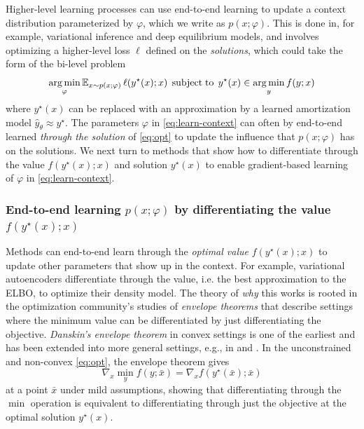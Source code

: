 \documentclass[twoside,11pt]{article}
\newcommand{\eg}{e.g.\xspace}
\newcommand{\ie}{i.e.\xspace}
\begin{document}
Higher-level learning processes can use end-to-end learning
to update a context distribution parameterized by
$\varphi$, which we write as $p(x; \varphi)$.
This is done in, for example, variational inference
and deep equilibrium models, and involves optimizing
a higher-level loss $\ell$ defined on the \emph{solutions},
which could take the form of the bi-level problem
\begin{equation}
  \operatorname*{arg\,min}_{\varphi} \operatorname{\mathbb{E}}_{x\sim p(x; \varphi)} \ell(y^\star(x); x)\;
  \operatorname*{subject\;to}\; y^\star(x)\in\operatorname*{arg\,min}_y f(y; x)
\label{eq:learn-context}
\end{equation}
where $y^\star(x)$ can be replaced with an approximation
by a learned amortization model $\hat y_\theta \approx y^\star$.
The parameters $\varphi$ in \cref{eq:learn-context} can
often by end-to-end learned \emph{through the solution} of
\cref{eq:opt} to update the influence that $p(x; \varphi)$
has on the solutions.
We next turn to methods that show how to differentiate
through the value $f(y^\star(x); x)$ and solution
$y^\star(x)$ to enable gradient-based learning of
$\varphi$ in \cref{eq:learn-context}.

\subsubsection{End-to-end learning $p(x; \varphi)$ by differentiating
  the value $f(y^\star(x); x)$}
Methods can end-to-end learn through the \emph{optimal value}
$f(y^\star(x); x)$ to update other parameters that show up
in the context.
For example, variational autoencoders differentiate through
the value, \ie the best approximation to the ELBO,
to optimize their density model.
The theory of \emph{why} this works is rooted in the
optimization community's studies of
\emph{envelope theorems}
that describe settings where the minimum value
can be differentiated by just differentiating
the objective.
\emph{Danskin's envelope theorem} \citep{danskin1966theory}
in convex settings is one of the earliest and has been
extended into more general settings, \eg, in
\citep[Prop. A.22]{bertsekas1971control}
and \cite{carter2001foundations,milgrom2002envelope,bonnans2013perturbation}.
In the unconstrained and non-convex \cref{eq:opt},
the envelope theorem gives
\begin{equation}
  \nabla_x \min_y f(y; \bar x) = \nabla_x f(y^\star(\bar x); \bar x)
  \label{eq:envelope}
\end{equation}
at a point $\bar x$ under mild assumptions, showing
that differentiating through the $\min$ operation is equivalent to differentiating
through just the objective at the optimal solution $y^\star(x)$.
\end{document}
